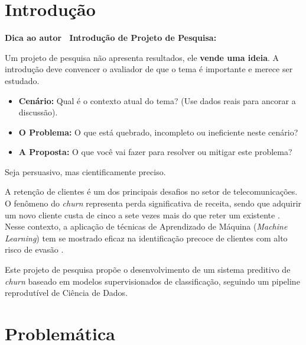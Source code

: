 \documentclass[
    article,
    12pt,
    oneside,
    a4paper,
    english,
    brazilian
    ]{abntex2}
\numberwithin{equation}{section}
\newenvironment{dica}{%
    \par\medskip
    \color{blue!60!black}\small\itshape
}{%
    \par\medskip
}
\begin{document}
\pretextual
\maketitle
\newpage

\textual

\section{Introdução}

\begin{dica}
\noindent\textbf{Dica ao autor \textemdash\ Introdução de Projeto de Pesquisa:}

Um projeto de pesquisa não apresenta resultados, ele \textbf{vende uma ideia}. A introdução deve convencer o avaliador de que o tema é importante e merece ser estudado.
\begin{itemize}
    \item \textbf{Cenário:} Qual é o contexto atual do tema? (Use dados reais para ancorar a discussão).
    \item \textbf{O Problema:} O que está quebrado, incompleto ou ineficiente neste cenário?
    \item \textbf{A Proposta:} O que você vai fazer para resolver ou mitigar este problema?
\end{itemize}
Seja persuasivo, mas cientificamente preciso.
\end{dica}

A retenção de clientes é um dos principais desafios no setor de telecomunicações. O fenômeno do \textit{churn} representa perda significativa de receita, sendo que adquirir um novo cliente custa de cinco a sete vezes mais do que reter um existente \cite{provost2013}. Nesse contexto, a aplicação de técnicas de Aprendizado de Máquina (\textit{Machine Learning}) tem se mostrado eficaz na identificação precoce de clientes com alto risco de evasão \cite{hastie2009}.

Este projeto de pesquisa propõe o desenvolvimento de um sistema preditivo de \textit{churn} baseado em modelos supervisionados de classificação, seguindo um pipeline reprodutível de Ciência de Dados.

\section{Problemática}
\end{document}
